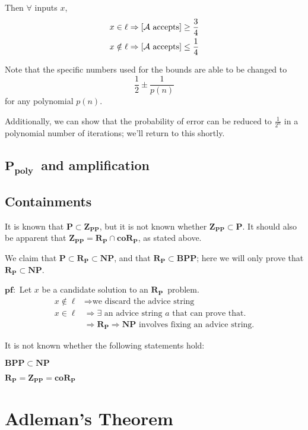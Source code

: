 \documentclass[11pt]{article}
\let\Pr\relax
\DeclareMathOperator*{\Pr}{\mathbb{P}}
\newcommand{\Pt}{\ensuremath{\mathbf{P}}}
\newcommand{\NP}{\ensuremath{\mathbf{NP}}}
\newcommand{\BPP}{\ensuremath{\mathbf{BPP}}}
\newcommand{\ZPP}{\ensuremath{\mathbf{Z_{PP}}}}
\newcommand{\RP}{\ensuremath{\mathbf{R_{P}}}}
\newcommand{\coRP}{\ensuremath{\mathbf{coR_{P}}}}
\newcommand{\Ppoly}{\ensuremath{\mathbf{P_{poly}}}}
\newcommand{\Alg}{\ensuremath{\mathcal{A}}}
\begin{document}
Then $\forall$ inputs $x$,
\begin{align*}
  x \in \ell &\Rightarrow \Pr[\Alg \text{ accepts}] \geq \frac{3}{4} \\
  x \notin \ell &\Rightarrow \Pr[\Alg \text{ accepts}] \leq \frac{1}{4} 
\end{align*}

Note that the specific numbers used for the bounds are able to be changed to 
$$\frac{1}{2} \pm \frac{1}{p(n)}$$
for any polynomial $p(n)$.

Additionally, we can show that the probability of error can be reduced to $\frac{1}{2^n}$ in a polynomial number of iterations; we'll return to this shortly.

\subsection{\Ppoly\ and amplification}

\subsection{Containments}

It is known that $\Pt\subset\ZPP$, but it is not known whether $\ZPP\subset\Pt$.
It should also be apparent that $\ZPP = \RP\cap\coRP$, as stated above.

We claim that $\Pt\subset\RP\subset\NP$, and that $\RP\subset\BPP$; here we will only prove that $\RP\subset\NP$.

$\mathbf{pf: }$
Let $x$ be a candidate solution to an \RP\ problem. 
\begin{align*}
  x\notin\ell &\Rightarrow \text{we discard the advice string}\\
  x\in\ell &\Rightarrow \exists\text{ an advice string $a$ that can prove that.}\\
  &\Rightarrow \RP \Rightarrow \NP \text{ involves fixing an advice string.} 
\end{align*}

It is not known whether the following statements hold:

$\BPP\subset\NP$

$\RP=\ZPP=\coRP$

\section{Adleman's Theorem}



\begin{thebibliography}{42}


\end{thebibliography}
\end{document}
